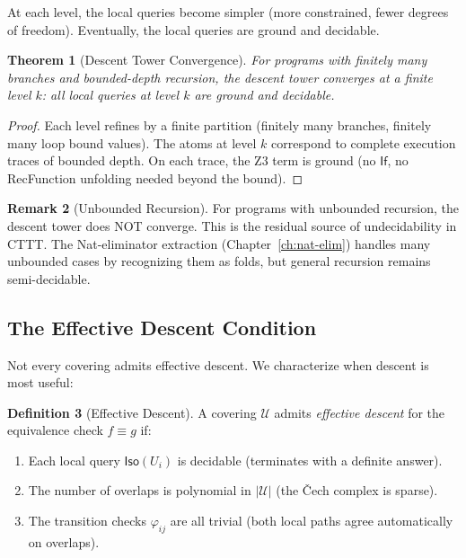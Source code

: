 \documentclass[11pt,a4paper]{report}
\theoremstyle{definition}
\newtheorem{definition}{Definition}[chapter]
\newtheorem{remark}[definition]{Remark}
\theoremstyle{plain}
\newtheorem{theorem}[definition]{Theorem}
\newcommand{\covers}{\mathcal{U}}
\newcommand{\Iso}{\mathsf{Iso}}
\begin{document}
At each level, the local queries become simpler (more constrained,
fewer degrees of freedom).  Eventually, the local queries are ground
and decidable.

\begin{theorem}[Descent Tower Convergence]
\label{thm:tower-convergence}
For programs with finitely many branches and bounded-depth
recursion, the descent tower converges at a finite level $k$:
all local queries at level $k$ are ground and decidable.
\end{theorem}

\begin{proof}
Each level refines by a finite partition (finitely many branches,
finitely many loop bound values).  The atoms at level $k$ correspond
to complete execution traces of bounded depth.  On each trace, the
Z3 term is ground (no $\mathsf{If}$, no RecFunction unfolding needed
beyond the bound).
\end{proof}

\begin{remark}[Unbounded Recursion]
For programs with unbounded recursion, the descent tower does NOT
converge.  This is the residual source of undecidability in CTTT.
The Nat-eliminator extraction (Chapter~\ref{ch:nat-elim}) handles
many unbounded cases by recognizing them as folds, but general
recursion remains semi-decidable.
\end{remark}

\subsection{The Effective Descent Condition}

Not every covering admits effective descent.  We characterize when
descent is most useful:

\begin{definition}[Effective Descent]
A covering $\covers$ admits \emph{effective descent} for the
equivalence check $f \equiv g$ if:
\begin{enumerate}
  \item Each local query $\Iso(U_i)$ is decidable (terminates with
    a definite answer).
  \item The number of overlaps is polynomial in $|\covers|$ (the
    \v{C}ech complex is sparse).
  \item The transition checks $\varphi_{ij}$ are all trivial
    (both local paths agree automatically on overlaps).
\end{enumerate}
\end{definition}
\end{document}
